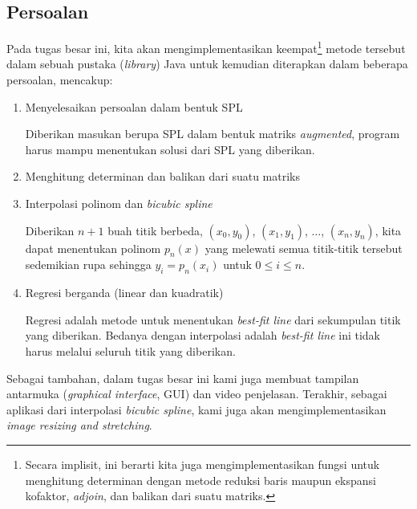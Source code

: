 \subsection{Persoalan}
\par Pada tugas besar ini, kita akan mengimplementasikan keempat\footnote{Secara implisit, ini berarti kita juga mengimplementasikan fungsi untuk menghitung determinan dengan metode reduksi baris maupun ekspansi kofaktor, \textit{adjoin}, dan balikan dari suatu matriks.} metode tersebut dalam sebuah pustaka (\textit{library}) Java untuk kemudian diterapkan dalam beberapa persoalan, mencakup:
\begin{enumerate}
    \item Menyelesaikan persoalan dalam bentuk SPL
    
    Diberikan masukan berupa SPL dalam bentuk matriks \textit{augmented}, program harus mampu menentukan solusi dari SPL yang diberikan.
    
    \item Menghitung determinan dan balikan dari suatu matriks
    \item Interpolasi polinom dan \textit{bicubic spline}
    
    Diberikan $n+1$ buah titik berbeda, $(x_0, y_0)$, $(x_1, y_1)$, $\ldots$, $(x_n, y_n)$, kita dapat menentukan polinom $p_n(x)$ yang melewati semua titik-titik tersebut sedemikian rupa sehingga $y_i = p_n(x_i)$ untuk $0 \leq i \leq n$.

    \item Regresi berganda (linear dan kuadratik)
    
    Regresi adalah metode untuk menentukan \textit{best-fit line} dari sekumpulan titik yang diberikan. Bedanya dengan interpolasi adalah \textit{best-fit line} ini tidak harus melalui seluruh titik yang diberikan.
\end{enumerate}

    Sebagai tambahan, dalam tugas besar ini kami juga membuat tampilan antarmuka (\textit{graphical interface}, GUI) dan video penjelasan. Terakhir, sebagai aplikasi dari interpolasi \textit{bicubic spline}, kami juga akan mengimplementasikan \textit{image resizing and stretching}.

\pagebreak